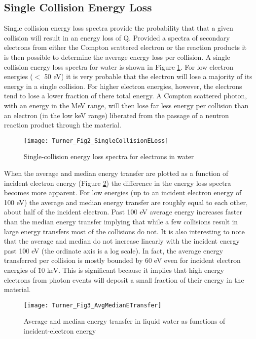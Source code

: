 \subsection{Single Collision Energy Loss}

Single collision energy loss spectra provide the probability that that a given collision will result in an energy loss of Q.
Provided a spectra of secondary electrons from either the Compton scattered electron or the  reaction products it is then possible to determine the average energy loss per collision.
A single collision energy loss spectra for water is shown in Figure \ref{fig:TurnerELoss}.
For low electron energies ($<$ 50 eV) it is very probable that the electron will lose a majority of its energy in a single collision.
For higher electron energies, however, the electrons tend to lose a lower fraction of there total energy. 
A Compton scattered photon, with an energy in the MeV range, will then lose far less energy per collision than an electron (in the low keV range) liberated from the passage of a neutron reaction product through the material.
\begin{figure}[ht]
    \centering
    \texttt{[image: Turner\_Fig2\_SingleCollisionELoss]}
    \caption{Single-collision energy loss spectra for electrons in water \protect\cite{turner}}
    \label{fig:TurnerELoss}
\end{figure}
When the average and median energy transfer are plotted as a function of incident electron energy (Figure \ref{fig:TurnerETransfer}) the difference in the energy loss spectra becomes more apparent.
For low energies (up to an incident electron energy of 100 eV) the average and median energy transfer are roughly equal to each other, about half of the incident electron.
Past 100 eV average energy increases faster than the median energy transfer implying that while a few collisions result in large energy transfers most of the collisions do not.
It is also interesting to note that the average and median do not increase linearly with the incident energy past 100 eV (the ordinate axis is a log scale). 
In fact, the average energy transferred per collision is mostly bounded by 60 eV even for incident electron energies of \~10 keV.
This is significant because it implies that high energy electrons from photon events will deposit a small fraction of their energy in the material.
\begin{figure}[ht]
    \centering
    \texttt{[image: Turner\_Fig3\_AvgMedianETransfer]}
    \caption{Average and median energy transfer in liquid water as functions of incident-electron energy \protect\cite{turner}}
    \label{fig:TurnerETransfer}
\end{figure}
